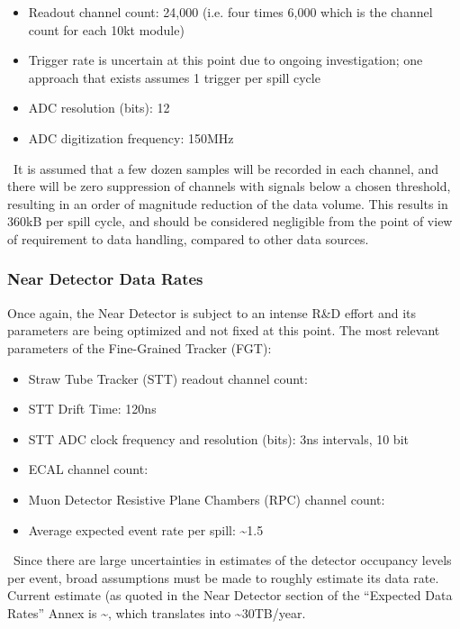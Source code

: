 \begin{itemize}
\item Readout channel count: 24,000 (i.e. four times 6,000 which is the channel count for each 10kt module)
\item Trigger rate is uncertain at this point due to ongoing investigation; one approach that exists assumes 1 trigger per spill cycle
\item ADC resolution (bits): 12
\item ADC digitization frequency: 150MHz
\end{itemize}
\
It is assumed that a few dozen samples will be recorded in each channel, and there will
be zero suppression of channels with signals below a chosen threshold, resulting in an order
of magnitude reduction of the data volume.
This results in 360kB per spill cycle, and should be considered negligible from the point of view of requirement to data handling, compared to other data sources.

\subsubsection{Near Detector Data Rates}
Once again, the Near Detector is subject to an intense R\&D effort and its
parameters are being optimized and not fixed at this point. The most relevant parameters
of the Fine-Grained Tracker (FGT):
\begin{itemize}
\item   Straw Tube Tracker (STT) readout channel count: \ndsstchannels
\item STT Drift Time: 120ns
\item STT ADC clock frequency and resolution (bits): 3ns intervals, 10 bit
\item ECAL channel count: \ndecalchannels
\item Muon Detector Resistive Plane Chambers (RPC) channel count: \ndmuidchannels
\item Average expected event rate per spill: \textasciitilde 1.5
\end{itemize}
\
Since there are large uncertainties in estimates of the detector occupancy levels per event, 
broad assumptions must be made to roughly estimate its data rate. Current estimate (as quoted in the Near Detector
section of the ``Expected Data Rates'' Annex is \textasciitilde \nddatarate, which translates into \textasciitilde 30TB/year.


